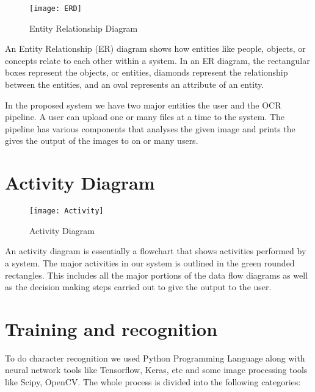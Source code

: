 \begin{figure}[htb]
\centering
\texttt{[image: ERD]}
\caption{Entity Relationship Diagram}
\end{figure}


An Entity Relationship (ER) diagram shows how entities like people, objects, or concepts relate to each other within a system. In an ER diagram, the rectangular boxes represent the objects, or entities, diamonds represent the relationship between the entities, and an oval represents an attribute of an entity.

In the proposed system we have two major entities the user and the OCR pipeline. A user can upload one or many files at a time to the system. The pipeline has various components that analyses the given image and prints the gives the output of the images to on or many users. 

\section{Activity Diagram}

\begin{figure}[htb]
\centering
\texttt{[image: Activity]}
\caption{Activity Diagram}
\end{figure}

An activity diagram is essentially a flowchart that shows activities performed by a system. 
The major activities in our system is outlined in the green rounded rectangles. This includes all the major portions of the data flow diagrams as well as the decision making steps carried out to give the output to the user.

\section{Training and recognition}
To do character recognition we used Python Programming Language along with neural network tools like Tensorflow, Keras, etc and some image processing tools like Scipy, OpenCV. The whole process is divided into the following categories:

